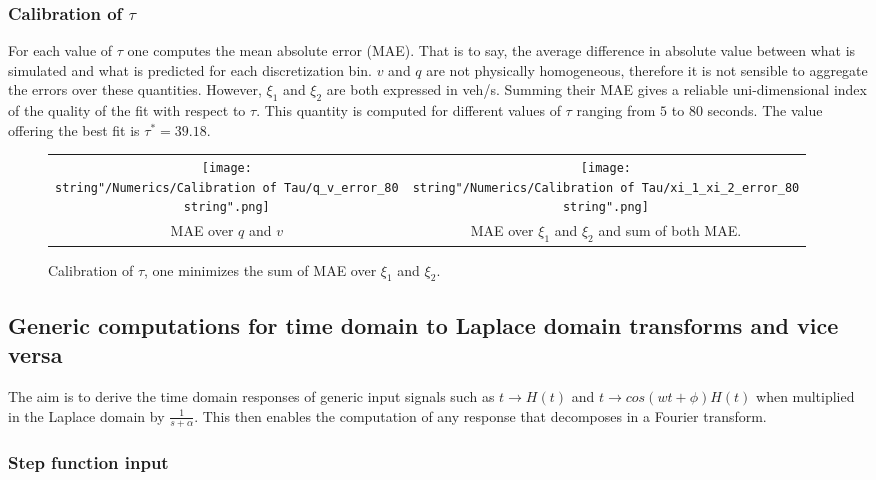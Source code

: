 \documentclass[preprint]{elsarticle}
\begin{document}
\subsubsection{Calibration of $\tau$\label{sub:Calibration-of-tau}}

For each value of $\tau$ one computes the mean absolute error (MAE).
That is to say, the average difference in absolute value between what
is simulated and what is predicted for each discretization bin.
$v$ and $q$ are not physically homogeneous, therefore it is not
sensible to aggregate the errors over these quantities. However, $\xi_{1}$
and $\xi_{2}$ are both expressed in veh/s. Summing their MAE gives
a reliable uni-dimensional index of the quality of the fit with respect
to $\tau$. This quantity is computed for different values of $\tau$
ranging from $5$ to $80$ seconds. The value offering the best fit
is $\tau^{*}=39.18$.

\begin{figure}[H]
\centering
\begin{tabular}{cc}
\texttt{[image: \\string"/Numerics/Calibration of Tau/q\_v\_error\_80\\string".png]} & \texttt{[image: \\string"/Numerics/Calibration of Tau/xi\_1\_xi\_2\_error\_80\\string".png]}\tabularnewline
MAE over $q$ and $v$ & MAE over $\xi_{1}$ and $\xi_{2}$ and sum of both MAE.\tabularnewline
\end{tabular}
\protect\caption{Calibration of $\tau$, one minimizes the sum of MAE over $\xi_{1}$
and $\xi_{2}$.}
\end{figure}


\subsection{Generic computations for time domain to Laplace domain transforms
and vice versa\label{sub:Generic-computations}}

The aim is to derive the time domain responses of generic input signals
such as $t\rightarrow H\left(t\right)$ and $t\rightarrow cos\left(wt+\phi\right)H\left(t\right)$
when multiplied in the Laplace domain by $\frac{1}{s+\alpha}$. This
then enables the computation of any response that decomposes in a
Fourier transform.


\subsubsection{Step function input}
\end{document}
